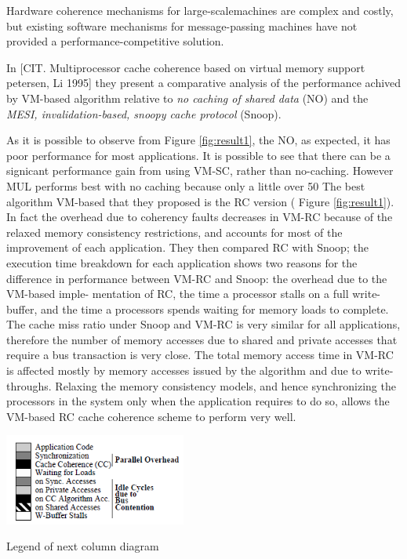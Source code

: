 \documentclass[a4paper,10pt]{article}
\makeatletter
\newenvironment{figurehere}{\def\@captype{figure}\vspace{2ex}}{\vspace{2ex}}
\makeatother
\begin{document}
\begin{multicols}{2}
Hardware coherence mechanisms for large-scalemachines are complex and costly, but existing software mechanisms for message-passing machines have not provided a performance-competitive solution. \par 
\parindent 10mm In  [CIT. Multiprocessor cache coherence based on virtual memory support  petersen, Li 1995]  they present a comparative analysis of the performance achived by VM-based algorithm relative to \emph{no caching of shared data} (NO) and the \emph{MESI, invalidation-based, snoopy cache protocol} (Snoop). \par 
\parindent 10mm
As it is possible to observe from Figure \ref{fig:result1}, the NO, as expected, it has poor performance for most applications. It is possible to see that there can be a signicant performance gain from using VM-SC, rather than no-caching. However MUL performs best with no caching because only a little over 50%
\parindent 10mm The best algorithm VM-based that they proposed is the RC version ( Figure \ref{fig:result1}). In fact the overhead due to coherency faults decreases in VM-RC because of the relaxed memory consistency restrictions, and accounts for most of the improvement of each application. They then compared RC with Snoop; the execution time breakdown for each application shows two reasons for the difference in performance between VM-RC and Snoop: the overhead due to the VM-based imple- mentation of RC, the time a processor stalls on a full write-buffer, and the time a processors spends waiting for memory loads to complete. The cache miss ratio under Snoop and VM-RC is very similar for all applications, therefore the number of memory accesses due to shared and private accesses that require a bus transaction is very close. The total memory access time in VM-RC is affected mostly by memory  accesses issued by the algorithm and due to write-throughs. Relaxing the memory consistency models, and hence synchronizing the processors in the system only  when the application requires to do so, allows the VM-based RC cache coherence scheme to perform very well.






\begin{figurehere}
 \centering
 \includegraphics[width=6cm, height=3cm]{./eps/Legenda_VM-based.PNG}
 \caption{Legend of next column diagram}
 \label{fig:legend}
\end{figurehere}


\end{multicols}
\end{document}
